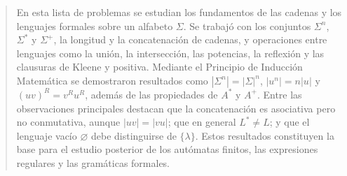 
\begin{abstract}
    \noindent En esta lista de problemas se estudian los fundamentos de las cadenas y los
    lenguajes formales sobre un alfabeto $\Sigma$. Se trabajó con los conjuntos
    $\Sigma^n$, $\Sigma^*$ y $\Sigma^+$, la longitud y la concatenación de cadenas, y
    operaciones entre lenguajes como la unión, la intersección, las potencias, la
    reflexión y las clausuras de Kleene y positiva. Mediante el Principio de
    Inducción Matemática se demostraron resultados como $|\Sigma^n| = |\Sigma|^n$,
    $|u^n| = n|u|$ y $(uv)^R = v^R u^R$, además de las propiedades de $A^*$ y $A^+$.
    Entre las observaciones principales destacan que la concatenación es asociativa
    pero no conmutativa, aunque $|uv| = |vu|$; que en general $L^* \neq L$; y que el
    lenguaje vacío $\varnothing$ debe distinguirse de $\{\lambda\}$. Estos resultados
    constituyen la base para el estudio posterior de los autómatas finitos, las
    expresiones regulares y las gramáticas formales.
\end{abstract}